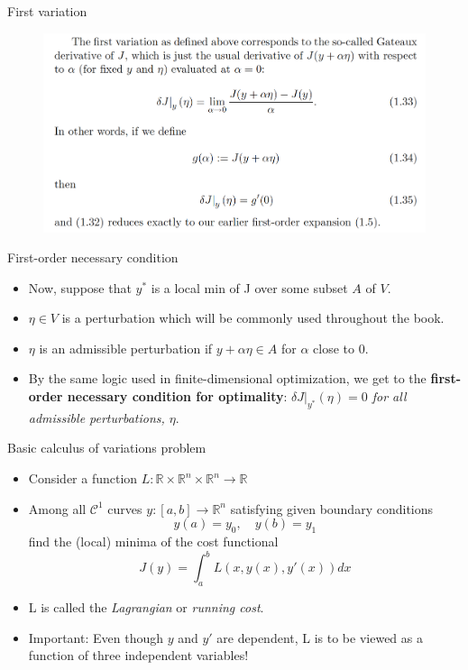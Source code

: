 \documentclass{beamer}
\begin{document}
\begin{frame}{First variation}
    \begin{figure}
        \centering
        \includegraphics[width=\linewidth]{ch1/fig5.png}
    \end{figure}
\end{frame}


\begin{frame}{First-order necessary condition}
    \begin{itemize}
        \item Now, suppose that $y^*$ is a local min of J over some subset $A$ of $V$.
        \item $\eta \in V$ is a perturbation which will be commonly used throughout the book.
        \item $\eta$ is an admissible perturbation if $y + \alpha \eta \in A$ for $\alpha$ close to 0.
        \item By the same logic used in finite-dimensional optimization, we get to the \textbf{first-order necessary condition for optimality}: \textit{$\delta J \vert_{y^*} (\eta) = 0$ for all admissible perturbations, $\eta$}.
    \end{itemize}
\end{frame}

\begin{frame}{Basic calculus of variations problem}
\begin{itemize}
    \item Consider a function $L: \mathbb{R} \times \mathbb{R}^n \times \mathbb{R}^n \rightarrow \mathbb{R}$
    \item Among all $\mathcal{C}^1$ curves $y:[a, b] \rightarrow \mathbb{R}^n$ satisfying given boundary conditions
    \begin{equation}
        y(a) = y_0, \quad y(b) = y_1
    \end{equation}
    find the (local) minima of the cost functional
    \begin{equation}
        J(y) = \int_a^b L(x, y(x), y'(x))dx
    \end{equation}
    \item L is called the \textit{Lagrangian} or \textit{running cost}.
    \item Important: Even though $y$ and $y'$ are dependent, L is to be viewed as a function of three independent variables!
\end{itemize}
\end{frame}
\end{document}
